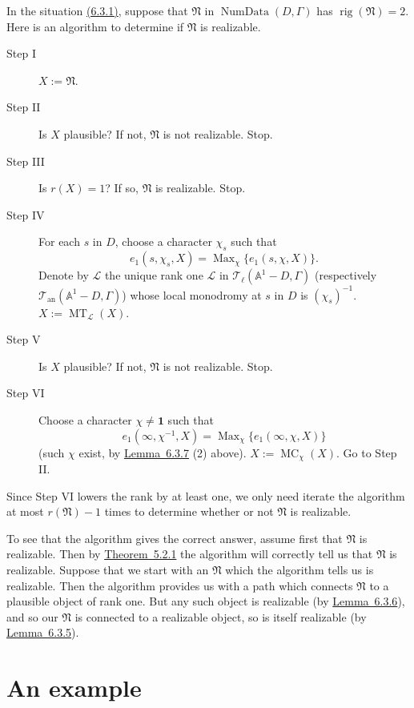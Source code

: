 In the situation \hyperref[par:6.3.1]{(6.3.1)}, suppose that \(\mathfrak{N}\) in \(\operatorname{NumData}(D,\Gamma)\) has \(\operatorname{rig}(\mathfrak{N})=2\). Here is an algorithm to determine if \(\mathfrak{N}\) is realizable.
\begin{description}
\item[Step I] \(X:=\mathfrak{N}\).
\item[Step II] Is \(X\) plausible? If not, \(\mathfrak{N}\) is not realizable. Stop.
\item[Step III] Is \(r(X)=1\)? If so, \(\mathfrak{N}\) is realizable. Stop.
\item[Step IV] For each \(s\) in \(D\), choose a character \(\chi_s\) such that
\[
e_1(s,\chi_s,X)=\operatorname{Max}_\chi\{e_1(s,\chi,X)\}.
\]
Denote by \(\mathcal{L}\) the unique rank one \(\mathcal{L}\) in \(\mathcal{T}_\ell(\mathbb{A}^1-D,\Gamma)\) (respectively \(\mathcal{T}_{\mathrm{an}}(\mathbb{A}^1-D,\Gamma)\)) whose local monodromy at \(s\) in \(D\) is \((\chi_s)^{-1}\). \(X:=\operatorname{MT}_{\mathcal{L}}(X)\).
\item[Step V] Is \(X\) plausible? If not, \(\mathfrak{N}\) is not realizable. Stop.
\item[Step VI] Choose a character \(\chi\ne\mathbf{1}\) such that
\[
e_1(\infty,\chi^{-1},X)=\operatorname{Max}_\chi\{e_1(\infty,\chi,X)\}
\]
(such \(\chi\) exist, by \hyperref[lem:6.3.7]{Lemma~6.3.7} (2) above). \(X:=\operatorname{MC}_\chi(X)\). Go to Step II.
\end{description}

Since Step VI lowers the rank by at least one, we only need iterate the algorithm at most \(r(\mathfrak{N})-1\) times to determine whether or not \(\mathfrak{N}\) is realizable.

To see that the algorithm gives the correct answer, assume first that \(\mathfrak{N}\) is realizable. Then by \hyperref[thm:5.2.1]{Theorem~5.2.1} the algorithm will correctly tell us that \(\mathfrak{N}\) is realizable. Suppose that we start with an \(\mathfrak{N}\) which the algorithm tells us is realizable. Then the algorithm provides us with a path which connects \(\mathfrak{N}\) to a plausible object of rank one. But any such object is realizable (by \hyperref[lem:6.3.6]{Lemma~6.3.6}), and so our \(\mathfrak{N}\) is connected to a realizable object, so is itself realizable (by \hyperref[lem:6.3.5]{Lemma~6.3.5}).

\section{An example}
\label{sec:6.5}

